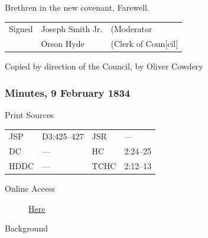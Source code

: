 					\begin{tightright}
					Brethren in the new covenant, Farewell.
					\end{tightright}
					
					\begin{tabular}{p{1in}p{2in}p{2in}}
					Signed & Joseph Smith Jr. & (Moderator \\
					 & Orson Hyde & (Clerk of Coun[cil]\\
					\end{tabular}
					
					Copied by direction of the Council, by Oliver Cowdery
					
		\subsubsection{Minutes, 9 February 1834}
			\label{EMS-1834-JS-9-FEB-1834}
			
			\begin{description}
					\item[Print Sources]
				\end{description}

					\begin{tabular}{p{0.5in}p{1in}p{0.5in}p{1in}}
					JSP	 	& D3:425--427		& JSR 		& --- \\
					DC	 	& --- 		& HC 		& 2:24--25 \\
					HDDC 	& ---		& TCHC 		& 2:12--13 \\
					\end{tabular}
				
				\begin{description}
					\item[Online Access] \href{https://www.josephsmithpapers.org/paper-summary/minutes-9-february-1834/1}{Here}
				\end{description}
				
				\begin{description}
					\item[Background]
				\end{description}
				
				
